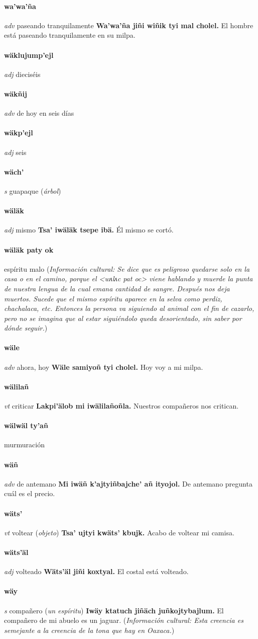 \documentclass{scrbook}
\newcommand{\entry}[1]{\paragraph{#1}}
\newcommand{\partofspeech}[1]{\textit{#1}}
\newcommand{\spanishtranslation}[1]{#1}
\newcommand{\clarification}[1]{(\textit{#1})}
\newcommand{\cholexample}[1]{\textbf{#1}}
\newcommand{\exampletranslation}[1]{#1}
\newcommand{\culturalinformation}[1]{(\textit{#1})}
\begin{document}
\begin{multicols}{2}
\entry{wa'wa'ña}
\partofspeech{adv}
\spanishtranslation{paseando tranquilamente}
\cholexample{Wa'wa'ña jiñi wiñik tyi mal cholel.}
\exampletranslation{El hombre está paseando tranquilamente en su milpa.}

\entry{wäklujump'ejl}
\partofspeech{adj}
\spanishtranslation{dieciséis}

\entry{wäkñij}
\partofspeech{adv}
\spanishtranslation{de hoy en seis días}

\entry{wäkp'ejl}
\partofspeech{adj}
\spanishtranslation{seis}

\entry{wäch'}
\partofspeech{s}
\spanishtranslation{guapaque}
\clarification{árbol}

\entry{wäläk}
\partofspeech{adj}
\spanishtranslation{mismo}
\cholexample{Tsa' iwäläk tsepe ibä.}
\exampletranslation{Él mismo se cortó.}

\entry{wäläk paty ok}
\spanishtranslation{espíritu malo}
\culturalinformation{Información cultural: Se dice que es peligroso quedarse solo en la casa o en el camino, porque el <wʌlʌc pat oc> viene hablando y muerde la punta de nuestra lengua de la cual emana cantidad de sangre. Después nos deja muertos. Sucede que el mismo espíritu aparece en la selva como perdiz, chachalaca, etc. Entonces la persona va siguiendo al animal con el fin de cazarlo, pero no se imagina que al estar siguiéndolo queda desorientado, sin saber por dónde seguir.}

\entry{wäle}
\partofspeech{adv}
\spanishtranslation{ahora, hoy}
\cholexample{Wäle samiyoñ tyi cholel.}
\exampletranslation{Hoy voy a mi milpa.}

\entry{wälilañ}
\partofspeech{vt}
\spanishtranslation{criticar}
\cholexample{Lakpi'älob mi iwälilañoñla.}
\exampletranslation{Nuestros compañeros nos critican.}

\entry{wälwäl ty'añ}
\spanishtranslation{murmuración}

\entry{wäñ}
\partofspeech{adv}
\spanishtranslation{de antemano}
\cholexample{Mi iwäñ k'ajtyiñbajche' añ ityojol.}
\exampletranslation{De antemano pregunta cuál es el precio.}

\entry{wäts'}
\partofspeech{vt}
\spanishtranslation{voltear}
\clarification{objeto}
\cholexample{Tsa' ujtyi kwäts' kbujk.}
\exampletranslation{Acabo de voltear mi camisa.}

\entry{wäts'äl}
\partofspeech{adj}
\spanishtranslation{volteado}
\cholexample{Wäts'äl jiñi koxtyal.}
\exampletranslation{El costal está volteado.}

\entry{wäy}
\partofspeech{s}
\spanishtranslation{compañero}
\clarification{un espíritu}
\cholexample{Iwäy ktatuch jiñäch juñkojtybajlum.}
\exampletranslation{El compañero de mi abuelo es un jaguar.}
\culturalinformation{Información cultural: Esta creencia es semejante a la creencia de la tona que hay en Oaxaca.}


\end{multicols}
\end{document}
